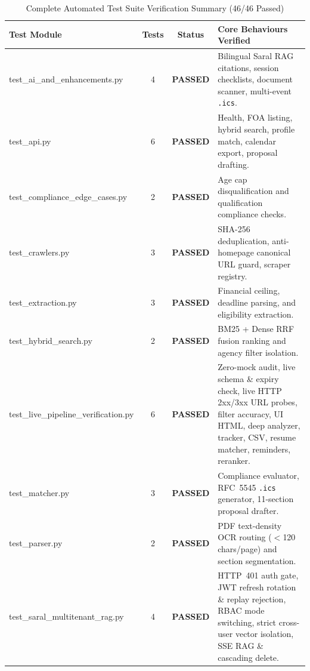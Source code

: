 \documentclass[12pt,a4paper,oneside]{report}
\begin{document}
\begin{table}[htbp]
    \centering
    \caption{Complete Automated Test Suite Verification Summary (46/46 Passed)}
    \label{tab:test_results}
    \footnotesize
    \begin{tabularx}{\textwidth}{>{\ttfamily}lccX}
        \toprule
        \textnormal{\textbf{Test Module}} & \textbf{Tests} & \textbf{Status} & \textnormal{\textbf{Core Behaviours Verified}} \\
        \midrule
        test\_ai\_and\_enhancements.py & 4 & \textcolor{successColor}{\textbf{PASSED}} & Bilingual Saral RAG citations, session checklists, document scanner, multi-event \texttt{.ics}. \\
        test\_api.py & 6 & \textcolor{successColor}{\textbf{PASSED}} & Health, FOA listing, hybrid search, profile match, calendar export, proposal drafting. \\
        test\_compliance\_edge\_cases.py & 2 & \textcolor{successColor}{\textbf{PASSED}} & Age cap disqualification and qualification compliance checks. \\
        test\_crawlers.py & 3 & \textcolor{successColor}{\textbf{PASSED}} & SHA-256 deduplication, anti-homepage canonical URL guard, scraper registry. \\
        test\_extraction.py & 3 & \textcolor{successColor}{\textbf{PASSED}} & Financial ceiling, deadline parsing, and eligibility extraction. \\
        test\_hybrid\_search.py & 2 & \textcolor{successColor}{\textbf{PASSED}} & BM25 + Dense RRF fusion ranking and agency filter isolation. \\
        test\_live\_pipeline\_verification.py & 6 & \textcolor{successColor}{\textbf{PASSED}} & Zero-mock audit, live schema \& expiry check, live HTTP 2xx/3xx URL probes, filter accuracy, UI HTML, deep analyzer, tracker, CSV, resume matcher, reminders, reranker. \\
        test\_matcher.py & 3 & \textcolor{successColor}{\textbf{PASSED}} & Compliance evaluator, RFC~5545 \texttt{.ics} generator, 11-section proposal drafter. \\
        test\_parser.py & 2 & \textcolor{successColor}{\textbf{PASSED}} & PDF text-density OCR routing ($<$120 chars/page) and section segmentation. \\
        test\_saral\_multitenant\_rag.py & 4 & \textcolor{successColor}{\textbf{PASSED}} & HTTP~401 auth gate, JWT refresh rotation \& replay rejection, RBAC mode switching, strict cross-user vector isolation, SSE RAG \& cascading delete. \\

\end{tabularx}
\end{table}
\end{document}
